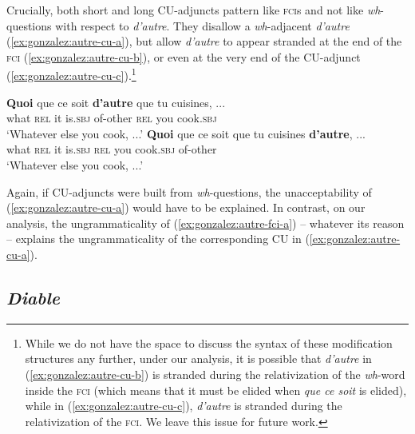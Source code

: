 \documentclass[output=paper]{langscibook}
\begin{document}
\z

Crucially, both short and long CU-adjuncts pattern like \textsc{fci}s and not like \emph{wh}-questions with respect to \emph{d'autre}. They disallow a \emph{wh}-adjacent \emph{d'autre} (\ref{ex:gonzalez:autre-cu-a}), but allow \emph{d'autre} to appear stranded at the  end of the \textsc{fci} (\ref{ex:gonzalez:autre-cu-b}), or even at the very end of the CU-adjunct (\ref{ex:gonzalez:autre-cu-c}).\footnote{While we do not have the space to discuss the syntax of these modification structures any further, under our analysis, it is possible that \emph{d'autre} in (\ref{ex:gonzalez:autre-cu-b}) is stranded during the relativization of the \emph{wh}-word inside the \textsc{fci} (which means that it must be elided when \emph{que ce soit} is elided), while in (\ref{ex:gonzalez:autre-cu-c}), \emph{d'autre} is stranded during the relativization of the \textsc{fci}. We leave this issue for future work.} 

\ea 
    \ex\label{ex:gonzalez:autre-cu-b}
    \gll  \textbf{Quoi} {que ce soit} \textbf{d'autre} que tu cuisines, ...\\
    what {\textsc{rel} it is.\textsc{sbj}} of-other \textsc{rel} you cook.\textsc{sbj} \\ \jambox{[CU]}
    \glt `Whatever else you cook, ...'
    \ex\label{ex:gonzalez:autre-cu-c}
    \gll  \textbf{Quoi} {que ce soit}  que tu cuisines \textbf{d'autre}, ... \\
    what {\textsc{rel} it is.\textsc{sbj}}  \textsc{rel} you cook.\textsc{sbj} of-other \\ \jambox{[CU]}
    \glt `Whatever else you cook, ...'
    \z
\z

Again, if CU-adjuncts were built from \emph{wh}-questions, the unacceptability of (\ref{ex:gonzalez:autre-cu-a}) would have to be explained. In contrast, on our analysis,  the ungrammaticality of (\ref{ex:gonzalez:autre-fci-a}) -- whatever its reason -- explains the ungrammaticality of the corresponding CU in (\ref{ex:gonzalez:autre-cu-a}).




\subsection{\emph{Diable}}
\end{document}
